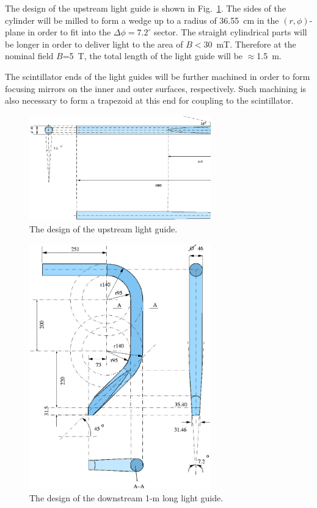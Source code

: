 The design of the upstream light guide is shown in Fig.~\ref{lgupstream}. 
The sides of the cylinder will be milled to form a wedge up to a radius of 
36.55~cm in the $(r,\phi)$-plane in order to fit into the 
$\Delta \phi=7.2^\circ$ sector.  The straight cylindrical parts will be longer
in order to deliver light to the area of $B<30$~mT.  Therefore at the nominal 
field $B$=5~T, the total length of the light guide will be $\approx$1.5~m.
 
The scintillator ends of the light guides will be further machined in order 
to form focusing mirrors on the inner and outer surfaces, respectively. 
Such machining is also necessary to form a trapezoid at this end for coupling 
to the scintillator.

\begin{figure}[htbp]
\centering
\includegraphics[width=0.7\textwidth]{t0lgupstr.ps}
\caption{\small{The design of the upstream light guide.}}
\label{lgupstream}
\end{figure}

\begin{figure}[htbp]
\centering
\includegraphics[width=0.7\textwidth]{t0lgdown.ps}
\caption{\small{The design of the downstream 1-m long light guide.}}
\label{lgdownstream}
\end{figure}

